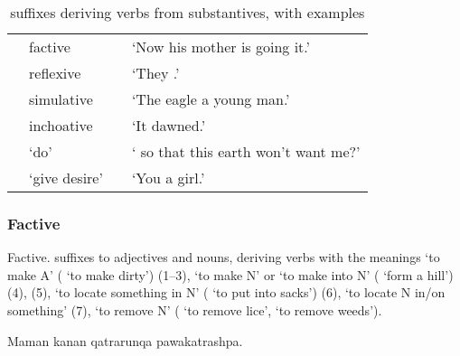 \begin{table}[!ht]
\caption{suffixes deriving verbs from substantives, with examples}\label{Tab26}
\begin{small}
\begin{center}
\begin{tabularx}{\textwidth}{l@{ }lL@{ }L}
\toprule
{}	& factive 		&  & `Now his mother is going  it.'		\\[0.5ex]
		& reflexive 	&  & `They .'		\\[0.5ex]
	& simulative 	&  & `The eagle  a young man.'		\\[0.5ex]
		& inchoative 	&  & `It dawned.'		\\[0.5ex]
		& `do'			&  & ` so that this earth won't want me?'	\\[0.5ex]
	& `give desire' &  & `You  a girl.'	\\
\bottomrule
\end{tabularx}
\end{center}
\end{small}
\end{table}

\subsubsection{Factive }\label{ssec:factive}
Factive.  suffixes to adjectives and nouns, deriving verbs with the meanings `to make A' ( `to make dirty') (1--3), `to make N' or `to make into N' ( `form a hill') (4), (5), `to locate something in N' ( `to put into sacks') (6), `to locate N in/on something' (7), `to remove N' ( `to remove lice',  `to remove weeds').

%
{Maman kanan qatrarunqa pawakatrashpa.}%
{}%
{}{}%

